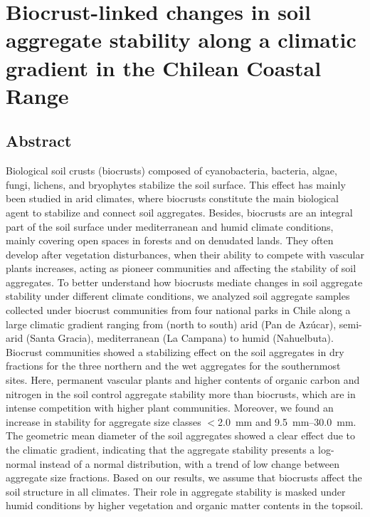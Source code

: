 
\chapter{Biocrust-linked changes in soil aggregate stability along a climatic gradient in the Chilean Coastal Range}
\label{chap:manuscript1} %

\section*{Abstract} %
Biological soil crusts (biocrusts) composed of cyanobacteria, bacteria, algae, fungi, lichens, and bryophytes stabilize the soil surface. This effect has mainly been studied in arid climates, where biocrusts constitute the main biological agent to stabilize and connect soil aggregates. Besides, biocrusts are an integral part of the soil surface under mediterranean and humid climate conditions, mainly covering open spaces in forests and on denudated lands. They often develop after vegetation disturbances, when their ability to compete with vascular plants increases, acting as pioneer communities and affecting the stability of soil aggregates. To better understand how biocrusts mediate changes in soil aggregate stability under different climate conditions, we analyzed soil aggregate samples collected under biocrust communities from four national parks in Chile along a large climatic gradient ranging from (north to south) arid (Pan de Azúcar), semi-arid (Santa Gracia), mediterranean (La Campana) to humid (Nahuelbuta). Biocrust communities showed a stabilizing effect on the soil aggregates in dry fractions for the three northern and the wet aggregates for the southernmost sites. Here, permanent vascular plants and higher contents of organic carbon and nitrogen in the soil control aggregate stability more than biocrusts, which are in intense competition with higher plant communities. Moreover, we found an increase in stability for aggregate size classes $<$\SI{2.0}{\milli\meter} and \SIrange[range-phrase=--,range-units=single]{9.5}{30.0}{\milli\meter}. The geometric mean diameter of the soil aggregates showed a clear effect due to the climatic gradient, indicating that the aggregate stability presents a log-normal instead of a normal distribution, with a trend of low change between aggregate size fractions. Based on our results, we assume that biocrusts affect the soil structure in all climates. Their role in aggregate stability is masked under humid conditions by higher vegetation and organic matter contents in the topsoil.

